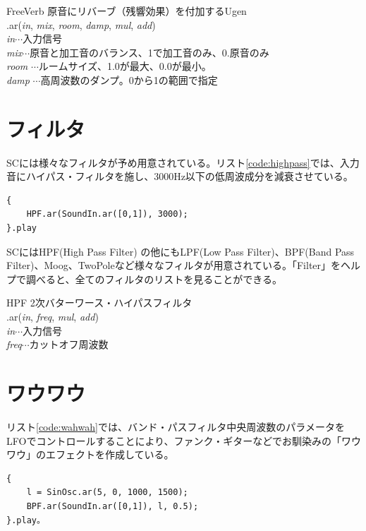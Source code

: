 \documentclass{jsarticle}
\begin{document}
\begin{itembox}[l]{FreeVerb}
{\footnotesize 
原音にリバーブ（残響効果）を付加するUgen\\
.ar({\it in}, {\it mix}, {\it room}, {\it damp}, {\it mul}, {\it add})\\
{\it in}$\cdots$入力信号\\
{\it mix}$\cdots$原音と加工音のバランス、1で加工音のみ、0.原音のみ\\
{\it room} $\cdots$ルームサイズ、1.0が最大、0.0が最小。\\
{\it damp} $\cdots$高周波数のダンプ。0から1の範囲で指定\\
}
\end{itembox}

\section{フィルタ}
SCには様々なフィルタが予め用意されている。リスト\ref{code:highpass}では、入力音にハイパス・フィルタを施し、3000Hz以下の低周波成分を減衰させている。

\begin{lstlisting}[caption=ハイパス・フィルタ, label=code:highpass]
{
	HPF.ar(SoundIn.ar([0,1]), 3000);
}.play
\end{lstlisting}

SCにはHPF(High Pass Filter) の他にもLPF(Low Pass Filter)、BPF(Band Pass Filter)、Moog、TwoPoleなど様々なフィルタが用意されている。「Filter」をヘルプで調べると、全てのフィルタのリストを見ることができる。

\begin{itembox}[l]{HPF}
{\footnotesize 
2次バターワース・ハイパスフィルタ\\
.ar({\it in}, {\it freq}, {\it mul}, {\it add})\\

{\it in}$\cdots$入力信号\\
{\it freq}$\cdots$カットオフ周波数\\
}
\end{itembox}

\section{ワウワウ}
リスト\ref{code:wahwah}では、バンド・パスフィルタ中央周波数のパラメータをLFOでコントロールすることにより、ファンク・ギターなどでお馴染みの「ワウワウ」のエフェクトを作成している。
\begin{lstlisting}[caption=ワウワウ, label=code:wahwah]
{
	l = SinOsc.ar(5, 0, 1000, 1500);
	BPF.ar(SoundIn.ar([0,1]), l, 0.5);
}.play。
\end{lstlisting}
\end{document}
